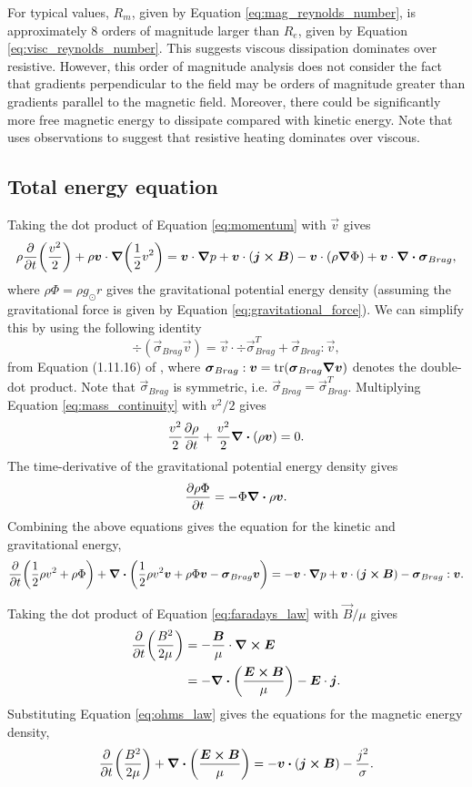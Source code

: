 For typical values, $R_m$, given by Equation \eqref{eq:mag_reynolds_number}, is approximately 8 orders of magnitude larger than $R_e$, given by Equation \eqref{eq:visc_reynolds_number}. This suggests viscous dissipation dominates over resistive. However, this order of magnitude analysis does not consider the fact that gradients perpendicular to the field may be orders of magnitude greater than gradients parallel to the magnetic field. Moreover, there could be significantly more free magnetic energy to dissipate compared with kinetic energy. Note that \citet{vanDoorsselaere2007} uses observations to suggest that resistive heating dominates over viscous.

\subsection{Total energy equation}
\label{sec:intro_total_energy_eqn}

Taking the dot product of Equation \eqref{eq:momentum} with $\vec{v}$ gives
\[\rho\pdv{}{t}\qty(\frac{v^2}{2}) + \rho\boldsymbol{v}\cdot\grad(\frac{1}{2}v^2)=\boldsymbol{v}\cdot\grad{p} + \boldsymbol{v}\cdot(\boldsymbol{j}\cross\boldsymbol{B}) - \boldsymbol{v}\cdot(\rho\grad{\Phi})+\boldsymbol{v}\cdot\div{\boldsymbol{\sigma}_{Brag}},\]
where $\rho\Phi=\rho g_{\odot}r$ gives the gravitational potential energy density (assuming the gravitational force is given by Equation \ref{eq:gravitational_force}). We can simplify this by using the following identity 
\[\div(\vec{\sigma}_{Brag}\vec{v})=\vec{v}\cdot\div{\vec{\sigma}_{Brag}^T} + \vec{\sigma}_{Brag}:\vec{v},\]
from Equation (1.11.16) of \citet{Kelly2020}, where $\boldsymbol{\sigma}_{Brag}:\boldsymbol{v}=\tr(\boldsymbol{\sigma}_{Brag}\grad{\boldsymbol{v}})$ denotes the double-dot product. Note that $\vec{\sigma}_{Brag}$ is symmetric, i.e. $\vec{\sigma}_{Brag}=\vec{\sigma}_{Brag}^T$.
Multiplying Equation \eqref{eq:mass_continuity} with $v^2/2$ gives
\[\frac{v^2}{2}\pdv{\rho}{t}+\frac{v^2}{2}\div(\rho\boldsymbol{v})=0.\]
The time-derivative of the gravitational potential energy density gives
\[\pdv{\rho\Phi}{t}=-\Phi\div{\rho\boldsymbol{v}}.\]
Combining the above equations gives the equation for the kinetic and gravitational energy,
\[
    \pdv{}{t}\qty(\frac{1}{2}\rho v^2 + \rho\Phi) + \div\qty(\frac{1}{2}\rho v^2\boldsymbol{v}+\rho\Phi\boldsymbol{v} - \boldsymbol{\sigma}_{Brag}\boldsymbol{v})=-\boldsymbol{v}\cdot\grad{p}+\boldsymbol{v}\cdot(\boldsymbol{j}\cross\boldsymbol{B})-\boldsymbol{\sigma}_{Brag}:\boldsymbol{v}.
\]

Taking the dot product of Equation \eqref{eq:faradays_law} with $\vec{B}/\mu$ gives
\[\begin{aligned}
\pdv{}{t}\qty(\frac{B^2}{2\mu})&=-\frac{\boldsymbol{B}}{\mu}\cdot\curl{\boldsymbol{E}} \\
&=-\div(\frac{\boldsymbol{E}\cross\boldsymbol{B}}{\mu})-\boldsymbol{E}\cdot\boldsymbol{j}.
\end{aligned}\]
Substituting Equation \eqref{eq:ohms_law} gives the equations for the magnetic energy density,
\[
    \pdv{}{t}\qty(\frac{B^2}{2\mu})+\div(\frac{\vec{E}\cross\vec{B}}{\mu})=-\vec{v}\vdot(\vec{j}\cross\vec{B})-\frac{j^2}{\sigma}.
\]

